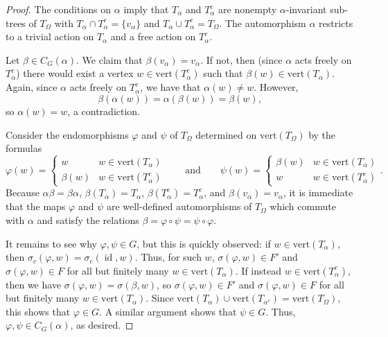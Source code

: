 \documentclass[12pt]{amsart}
\theoremstyle{definition}
\theoremstyle{remark}
\newcommand{\id}{\operatorname{id}}
\begin{document}
\begin{proof}
The conditions on $\alpha$ imply that $T_{\alpha}$ and $T_{\alpha}^c$ are nonempty $\alpha$-invariant sub-trees of $T_{\Omega}$ with $T_{\alpha}\cap T_{\alpha}^c = \{v_{\alpha}\}$ and $T_{\alpha}\cup T_{\alpha}^c = T_{\Omega}$. The automorphism $\alpha$ restricts to a trivial action on $T_{\alpha}$ and a free action on $T_{\alpha}^c$.

Let $\beta \in C_G(\alpha)$. We claim that  $\beta(v_{\alpha}) = v_{\alpha}$. If not, then (since $\alpha$ acts freely on $T_{\alpha}^c$) there would exist a vertex $w \in \text{vert}(T_\alpha^c)$ such that $\beta(w) \in \text{vert}(T_\alpha)$. Again, since $\alpha$ acts freely on $T_\alpha^c$, we have that $\alpha(w) \neq w$. However,
\begin{equation*}
  \beta(\alpha(w)) = \alpha(\beta(w)) = \beta(w),
\end{equation*}
so $\alpha(w) = w$, a contradiction.

Consider the endomorphisms $\varphi$ and $\psi$ of $T_{\Omega}$ determined on $\text{vert}(T_{\Omega})$ by the formulas
\begin{equation*}
    \varphi(w) = \begin{cases}
        w & w \in \text{vert}(T_\alpha) \\
        \beta(w) & w \in \text{vert}(T_\alpha^c)
    \end{cases}\qquad\text{and}\qquad\psi(w) = \begin{cases}
        \beta(w) & w \in \text{vert}(T_\alpha) \\
        w & w \in \text{vert}(T_\alpha^c)
    \end{cases}.
\end{equation*}
Because $\alpha\beta = \beta\alpha$, $\beta(T_{\alpha}) = T_{\alpha}$, $\beta(T_{\alpha}^c) = T_{\alpha}^c$, and $\beta(v_{\alpha}) = v_{\alpha}$, it is immediate that the maps $\varphi$ and $\psi$ are well-defined automorphisms of $T_{\Omega}$ which commute with $\alpha$ and satisfy the relations $\beta = \varphi \circ \psi = \psi \circ \varphi$. 

It remains to see why $\varphi, \psi\in G$, but this is quickly observed: if $w \in \text{vert}(T_\alpha)$, then $\sigma_c(\varphi,w) = \sigma_c(\id,w)$. Thus, for such $w$, $\sigma(\varphi,w) \in F'$ and $\sigma(\varphi,w) \in F$ for all but finitely many $w\in \text{vert}(T_{\alpha})$. If instead $w \in \text{vert}(T_\alpha^c)$, then we have $\sigma(\varphi,w) = \sigma(\beta,w)$, so $\sigma(\varphi,w)\in F'$ and $\sigma(\varphi,w) \in F$ for all but finitely many $w\in \text{vert}(T_{\alpha})$. Since $\text{vert}(T_{\alpha})\cup \text{vert}(T_{\alpha^c}) = \text{vert}(T_{\Omega}),$ this shows that $\varphi \in G$. A similar argument shows that $\psi \in G$. Thus, $\varphi, \psi\in C_G(\alpha)$, as desired.
\end{proof}
\end{document}
